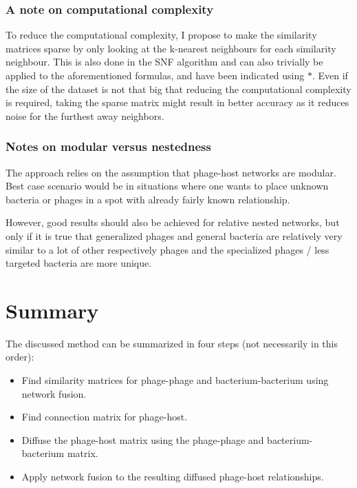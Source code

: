 \documentclass{article}
\begin{document}
\subsubsection{A note on computational complexity}

To reduce the computational complexity, I propose to make the similarity matrices sparse by only
looking at the k-nearest neighbours for each similarity neighbour.
This is also done in the SNF algorithm and can also trivially be applied 
to the aforementioned formulas, and have been indicated using $*$.
Even if the size of the dataset is not that big that reducing the
computational complexity is required, taking the sparse matrix might 
result in better accuracy as it reduces noise for the furthest away neighbors.

\subsubsection{Notes on modular versus nestedness}

The approach relies on the assumption that phage-host networks are
modular. Best case scenario would be in situations where one wants to place
unknown bacteria or phages in a spot with already fairly known relationship. 

However, good results should also be achieved for relative nested networks,
but only if it is 
true that generalized phages and general bacteria are relatively very 
similar to a lot of other respectively phages and 
the specialized phages / less targeted bacteria are more unique. 

\section{Summary}

The discussed method can be summarized in four steps (not necessarily in this order):

\begin{itemize}
\item Find similarity matrices for phage-phage and bacterium-bacterium using network fusion.
\item Find connection matrix for phage-host.
\item Diffuse the phage-host matrix using the phage-phage and bacterium-bacterium matrix.
\item Apply network fusion to the resulting diffused phage-host relationships.
\end{itemize}
\end{document}
